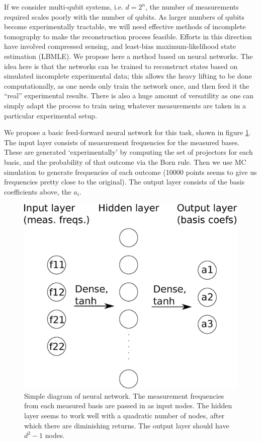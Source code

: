 \documentclass[a4paper,10pt]{article}
\begin{document}
If we consider multi-qubit systems, i.e. $d = 2^n$, the number of measurements required scales poorly with the number of qubits. As larger numbers of qubits become experimentally tractable, we will need effective methods of incomplete tomography to make the reconstruction process feasible. Efforts in this direction have involved compressed sensing, and least-bias maximum-likelihood state estimation (LBMLE). We propose here a method based on neural networks. The idea here is that the networks can be trained to reconstruct states based on simulated incomplete experimental data; this allows the heavy lifting to be done computationally, as one needs only train the network once, and then feed it the ``real'' experimental results. There is also a huge amount of versatility as one can simply adapt the process to train using whatever measurements are taken in a particular experimental setup.

We propose a basic feed-forward neural network for this task, shown in figure \ref{fig:nn}. The input layer consists of measurement frequencies for the measured bases. These are generated `experimentally' by computing the set of projectors for each basis, and the probability of that outcome via the Born rule. Then we use MC simulation to generate frequencies of each outcome (10000 points seems to give us frequencies pretty close to the original). The output layer consists of the basis coefficients above, the $a_i$.

\begin{figure}
 \includegraphics[scale=0.5]{nn_schematic}
 \caption{Simple diagram of neural network. The measurement frequencies from each measured basis are passed in as input nodes. The hidden layer seems to work well with a quadratic number of nodes, after which there are diminishing returns. The output layer should have $d^2 - 1$ nodes.}
 \label{fig:nn}
\end{figure}
\end{document}
